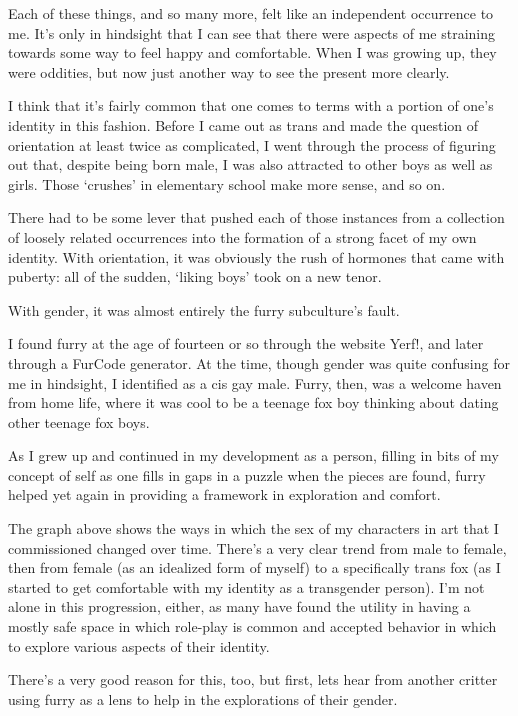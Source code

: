 Each of these things, and so many more, felt like an independent occurrence to me.  It's only in hindsight that I can see that there were aspects of me straining towards some way to feel happy and comfortable.  When I was growing up, they were oddities, but now just another way to see the present more clearly.

I think that it's fairly common that one comes to terms with a portion of one's identity in this fashion.  Before I came out as trans and made the question of orientation at least twice as complicated, I went through the process of figuring out that, despite being born male, I was also attracted to other boys as well as girls.  Those `crushes' in elementary school make more sense, and so on.

There had to be some lever that pushed each of those instances from a collection of loosely related occurrences into the formation of a strong facet of my own identity.  With orientation, it was obviously the rush of hormones that came with puberty: all of the sudden, `liking boys' took on a new tenor.

With gender, it was almost entirely the furry subculture's fault.

I found furry at the age of fourteen or so through the website Yerf!, and later through a FurCode generator.  At the time, though gender was quite confusing for me in hindsight, I identified as a cis gay male.  Furry, then, was a welcome haven from home life, where it was cool to be a teenage fox boy thinking about dating other teenage fox boys.

As I grew up and continued in my development as a person, filling in bits of my concept of self as one fills in gaps in a puzzle when the pieces are found, furry helped yet again in providing a framework in exploration and comfort.


The graph above shows the ways in which the sex of my characters in art that I commissioned changed over time.  There's a very clear trend from male to female, then from female (as an idealized form of myself) to a specifically trans fox (as I started to get comfortable with my identity as a transgender person).  I'm not alone in this progression, either, as many have found the utility in having a mostly safe space in which role-play is common and accepted behavior in which to explore various aspects of their identity.

There's a very good reason for this, too, but first, lets hear from another critter using furry as a lens to help in the explorations of their gender.

